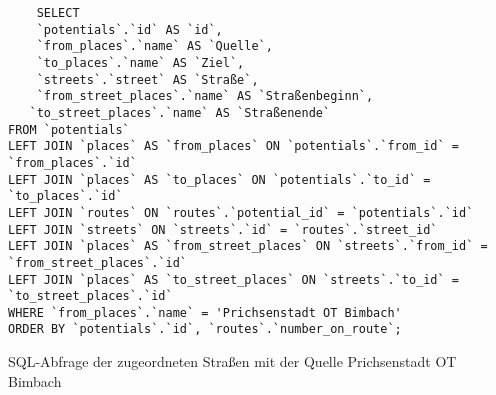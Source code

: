 \begin{listing}[htbp]
\begin{verbatim}
    SELECT 
	`potentials`.`id` AS `id`,
	`from_places`.`name` AS `Quelle`, 
	`to_places`.`name` AS `Ziel`,
	`streets`.`street` AS `Straße`,
	`from_street_places`.`name` AS `Straßenbeginn`,
   `to_street_places`.`name` AS `Straßenende`
FROM `potentials`
LEFT JOIN `places` AS `from_places` ON `potentials`.`from_id` = `from_places`.`id`
LEFT JOIN `places` AS `to_places` ON `potentials`.`to_id` = `to_places`.`id`
LEFT JOIN `routes` ON `routes`.`potential_id` = `potentials`.`id`
LEFT JOIN `streets` ON `streets`.`id` = `routes`.`street_id`
LEFT JOIN `places` AS `from_street_places` ON `streets`.`from_id` = `from_street_places`.`id`
LEFT JOIN `places` AS `to_street_places` ON `streets`.`to_id` = `to_street_places`.`id`
WHERE `from_places`.`name` = 'Prichsenstadt OT Bimbach'
ORDER BY `potentials`.`id`, `routes`.`number_on_route`;
\end{verbatim}
\caption{SQL-Abfrage der zugeordneten Straßen mit der Quelle Prichsenstadt OT Bimbach}\label{lst-rt-bimbach}
\end{listing}


